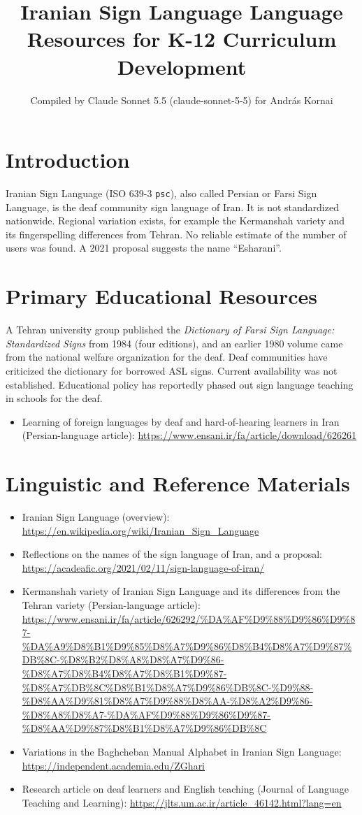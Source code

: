\documentclass[12pt]{article}
\title{Iranian Sign Language Language Resources for K-12 Curriculum Development}
\author{Compiled by Claude Sonnet 5.5 (claude-sonnet-5-5) for Andr\'as Kornai}
\date{}
\begin{document}
\maketitle

\section{Introduction}
Iranian Sign Language (ISO 639-3 \texttt{psc}), also called Persian or Farsi Sign Language, is the deaf community sign language of Iran. It is not standardized nationwide. Regional variation exists, for example the Kermanshah variety and its fingerspelling differences from Tehran. No reliable estimate of the number of users was found. A 2021 proposal suggests the name ``Esharani''.

\section{Primary Educational Resources}
A Tehran university group published the \emph{Dictionary of Farsi Sign Language: Standardized Signs} from 1984 (four editions), and an earlier 1980 volume came from the national welfare organization for the deaf. Deaf communities have criticized the dictionary for borrowed ASL signs. Current availability was not established. Educational policy has reportedly phased out sign language teaching in schools for the deaf.
\begin{itemize}
\item Learning of foreign languages by deaf and hard-of-hearing learners in Iran (Persian-language article): \url{https://www.ensani.ir/fa/article/download/626261}
\end{itemize}

\section{Linguistic and Reference Materials}
\begin{itemize}
\item Iranian Sign Language (overview): \url{https://en.wikipedia.org/wiki/Iranian_Sign_Language}
\item Reflections on the names of the sign language of Iran, and a proposal: \url{https://acadeafic.org/2021/02/11/sign-language-of-iran/}
\item Kermanshah variety of Iranian Sign Language and its differences from the Tehran variety (Persian-language article): \url{https://www.ensani.ir/fa/article/626292/%DA%AF%D9%88%D9%86%D9%87-%DA%A9%D8%B1%D9%85%D8%A7%D9%86%D8%B4%D8%A7%D9%87%DB%8C-%D8%B2%D8%A8%D8%A7%D9%86-%D8%A7%D8%B4%D8%A7%D8%B1%D9%87-%D8%A7%DB%8C%D8%B1%D8%A7%D9%86%DB%8C-%D9%88-%D8%AA%D9%81%D8%A7%D9%88%D8%AA-%D8%A2%D9%86-%D8%A8%D8%A7-%DA%AF%D9%88%D9%86%D9%87-%D8%AA%D9%87%D8%B1%D8%A7%D9%86%DB%8C}
\item Variations in the Baghcheban Manual Alphabet in Iranian Sign Language: \url{https://independent.academia.edu/ZGhari}
\item Research article on deaf learners and English teaching (Journal of Language Teaching and Learning): \url{https://jlts.um.ac.ir/article_46142.html?lang=en}
\end{itemize}
\end{document}

